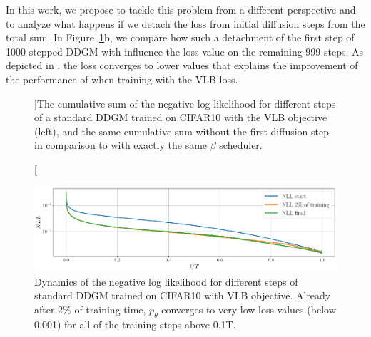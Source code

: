 In this work, we propose to tackle this problem from a different perspective and to analyze what happens if we detach the loss from initial diffusion steps from the total sum. In Figure~\ref{fig:nnl_cumsum_fullfig}b, we compare how such a detachment of the first step of 1000-stepped DDGM with \ours{} influence the loss value on the remaining 999 steps. As depicted in \ours{}, the loss converges to lower values that explains the improvement of the performance of \ours{} when training with the VLB loss.

\begin{figure}[ht]
	\centering
	\caption[][\baselineskip]{The cumulative sum of the negative log likelihood for different steps of a standard DDGM trained on CIFAR10 with the VLB objective (left), and the same cumulative sum without the first diffusion step in comparison to \ours{} with exactly the same $\beta$ scheduler.}
	\label{fig:nnl_cumsum_fullfig}
	\vspace*{2\baselineskip}
\end{figure}
\begin{figure}[ht]
	\centering
    \includegraphics[width=\textwidth]{pics/4_daed/experiments/NLL_dynamics.pdf}
	\caption{Dynamics of the negative log likelihood for different steps of standard DDGM trained on CIFAR10 with VLB objective. Already after 2\% of training time, $p_\theta$ converges to very low loss values (below 0.001) for all of the training steps above 0.1T. }
	\label{fig:NLL_dynamics}
		\vspace*{2\baselineskip}
\end{figure}



